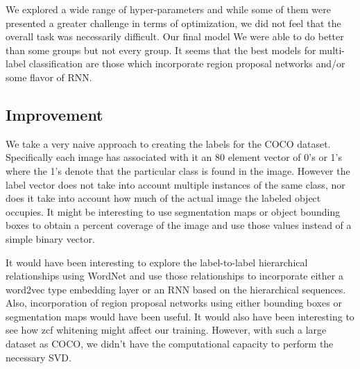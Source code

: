 \documentclass[12pt,journal,compsoc]{IEEEtran}
\begin{document}


We explored a wide range of hyper-parameters and while some of them were presented a greater challenge in terms of optimization, we did not feel that the overall task was necessarily difficult. Our final model We were able to do better than some groups but not every group. It seems that the best models for multi-label classification are those which incorporate region proposal networks and/or some flavor of RNN.

\subsection{Improvement}


We take a very naive approach to creating the labels for the COCO dataset.  Specifically each image has associated with it an 80 element vector of 0's or 1's where the 1's denote that the particular class is found in the image.  However the label vector does not take into account multiple instances of the same class, nor does it take into account how much of the actual image the labeled object occupies.  It might be interesting to use segmentation maps or object bounding boxes to obtain a percent coverage of the image and use those values instead of a simple binary vector.


It would have been interesting to explore the label-to-label hierarchical relationships using WordNet and use those relationships to incorporate either a word2vec type embedding layer or an RNN based on the hierarchical sequences.  Also, incorporation of region proposal networks using either bounding boxes or segmentation maps would have been useful.  It would also have been interesting to see how zcf whitening might affect our training.  However, with such a large dataset as COCO, we didn't have the computational capacity to perform the necessary SVD.
\end{document}
